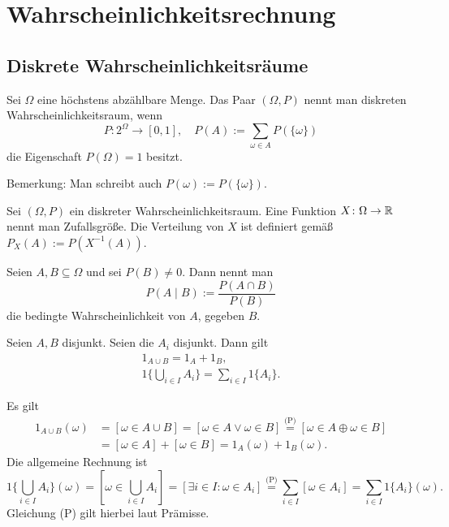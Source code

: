 
\chapter{Wahrscheinlichkeitsrechnung}

\section{Diskrete Wahrscheinlichkeitsräume}

\begin{Definition}%
\label{def:discrete-prob-space}\newlinefirst
Sei $\Omega$ eine höchstens abzählbare Menge. Das
Paar $(\Omega,P)$ nennt man diskreten Wahrscheinlichkeitsraum,
wenn
\[P\colon 2^\Omega\to [0,1],\quad P(A):=\sum_{\omega\in A} P(\{\omega\})\]
die Eigenschaft $P(\Omega) = 1$ besitzt.
\end{Definition}
Bemerkung: Man schreibt auch $P(\omega):=P(\{\omega\})$.

\begin{Definition}%
\newlinefirst
Sei $(\Omega,P)$ ein diskreter Wahrscheinlichkeitsraum.
Eine Funktion $X\colon\Omega\to\mathbb R$ nennt man Zufallsgröße.
Die Verteilung von $X$ ist definiert gemäß $P_X(A):=P(X^{-1}(A))$.
\end{Definition}

\begin{Definition}%
\newlinefirst
Seien $A,B\subseteq\Omega$ und sei $P(B)\ne 0$. Dann nennt man
\[P(A\mid B) := \frac{P(A\cap B)}{P(B)}\]
die bedingte Wahrscheinlichkeit von $A$, gegeben $B$.
\end{Definition}

\begin{Lemma}\label{indicator-disjoint}
Seien $A,B$ disjunkt. Seien die $A_i$ disjunkt. Dann gilt
\begin{gather*}
1_{A\cup B} = 1_A + 1_B,\\
1\{\bigcup_{i\in I} A_i\} = \sum_{i\in I} 1\{A_i\}.
\end{gather*}
\end{Lemma}
\begin{Beweis}
Es gilt
\begin{align*}
1_{A\cup B}(\omega) &= [\omega\in A\cup B]
= [\omega\in A\lor\omega\in B]
\stackrel{\text{(P)}}= [\omega\in A\oplus\omega\in B]\\
&= [\omega\in A] + [\omega\in B] = 1_A(\omega) + 1_B(\omega).
\end{align*}
Die allgemeine Rechnung ist
\[1\{\bigcup_{i\in I} A_i\}(\omega) = [\omega\in\bigcup_{i\in I} A_i]
= [\exists i\in I\colon \omega\in A_i]
\stackrel{\text{(P)}}= \sum_{i\in I} [\omega\in A_i]
= \sum_{i\in I} 1\{A_i\}(\omega).\]
Gleichung (P) gilt hierbei laut Prämisse.\,\qedsymbol
\end{Beweis}

